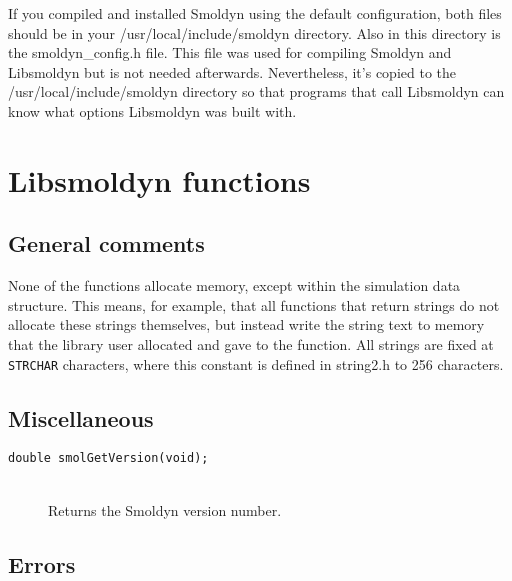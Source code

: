 \documentclass {book}
\begin{document}
If you compiled and installed Smoldyn using the default configuration, both files should be in your /usr/local/include/smoldyn directory.  Also in this directory is the smoldyn\_config.h file.  This file was used for compiling Smoldyn and Libsmoldyn but is not needed afterwards.  Nevertheless, it's copied to the /usr/local/include/smoldyn directory so that programs that call Libsmoldyn can know what options Libsmoldyn was built with.




\chapter{Libsmoldyn functions}

\section{General comments}

None of the functions allocate memory, except within the simulation data structure.  This means, for example, that all functions that return strings do not allocate these strings themselves, but instead write the string text to memory that the library user allocated and gave to the function.
All strings are fixed at \texttt{STRCHAR} characters, where this constant is defined in string2.h to 256 characters.

\section{Miscellaneous}

\begin{description}

\item[\texttt{double smolGetVersion(void);}]
\hfill \\
Returns the Smoldyn version number.

\end{description}


\section{Errors}
\end{document}
